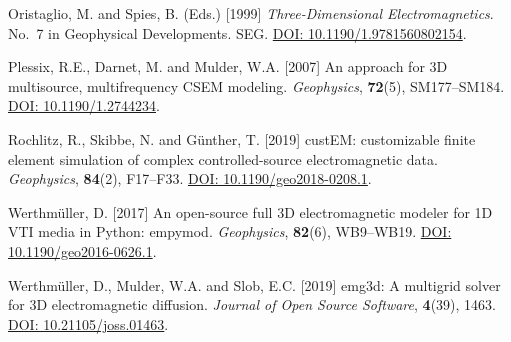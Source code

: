 \documentclass{eage2020}
\begin{document}
\begin{thebibliography}{11}
Oristaglio, M. and Spies, B. (Eds.)  [1999] \emph{Three-Dimensional
  Electromagnetics}.
\newblock No.~7 in Geophysical Developments. SEG.
\newblock \href{https://doi.org/10.1190/1.9781560802154}{DOI:
  10.1190/1.9781560802154}.

Plessix, R.E., Darnet, M. and Mulder, W.A. [2007] An approach for {3D}
  multisource, multifrequency {CSEM} modeling.
\newblock \emph{Geophysics}, \textbf{72}(5), SM177--SM184.
\newblock \href{https://doi.org/10.1190/1.2744234}{DOI: 10.1190/1.2744234}.

Rochlitz, R., Skibbe, N. and Günther, T. [2019] {custEM}: customizable finite
  element simulation of complex controlled-source electromagnetic data.
\newblock \emph{Geophysics}, \textbf{84}(2), F17--F33.
\newblock \href{https://doi.org/10.1190/geo2018-0208.1}{DOI:
  10.1190/geo2018-0208.1}.

Werthmüller, D. [2017] An open-source full {3D} electromagnetic modeler for
  {1D} {VTI} media in {P}ython: empymod.
\newblock \emph{Geophysics}, \textbf{82}(6), WB9--WB19.
\newblock \href{https://doi.org/10.1190/geo2016-0626.1}{DOI:
  10.1190/geo2016-0626.1}.

Werthmüller, D., Mulder, W.A. and Slob, E.C. [2019] {e}mg3d: {A} multigrid
  solver for {3D} electromagnetic diffusion.
\newblock \emph{Journal of Open Source Software}, \textbf{4}(39), 1463.
\newblock \href{https://doi.org/10.21105/joss.01463}{DOI: 10.21105/joss.01463}.

\end{thebibliography}
\end{document}
